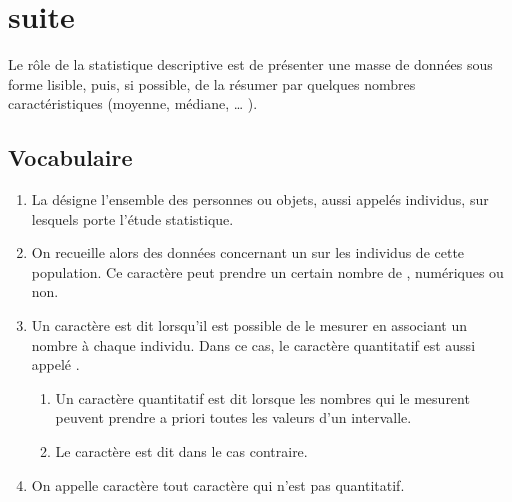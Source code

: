 

\chapter{suite}

Le rôle de la statistique descriptive est de présenter une masse de
données sous forme lisible, puis, si possible, de la résumer par
quelques nombres caractéristiques (moyenne, médiane, {\ldots} ).




\section{Vocabulaire}

\begin{enumerate}
    \item La  désigne l'ensemble des personnes ou objets,
  aussi appelés individus, sur lesquels porte l'étude
  statistique.  
\item On recueille alors des données concernant un  sur
  les individus de cette population. Ce caractère peut prendre un
  certain nombre de , numériques ou non.
\item Un caractère est dit  lorsqu'il est possible de
  le mesurer en associant un nombre à chaque individu. Dans ce cas, le
  caractère quantitatif est aussi appelé .
  \begin{enumerate}
      \item Un caractère quantitatif est dit  lorsque les
    nombres qui le mesurent peuvent prendre a priori toutes les
    valeurs d'un intervalle.
\item Le caractère est dit  dans le cas contraire.
  \end{enumerate}
\item On appelle caractère  tout caractère qui n'est
  pas quantitatif.
\end{enumerate}


